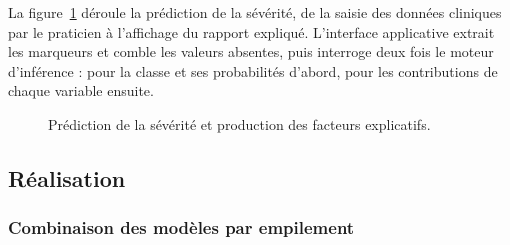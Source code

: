 La figure~\ref{fig:seq-osa} déroule la prédiction de la sévérité, de la saisie des données
cliniques par le praticien à l'affichage du rapport expliqué. L'interface applicative
extrait les marqueurs et comble les valeurs absentes, puis interroge deux fois le moteur
d'inférence : pour la classe et ses probabilités d'abord, pour les contributions de chaque
variable ensuite.

\begin{figure}[H]
\centering
{}
\caption[Séquence de prédiction de la sévérité]%
        {Prédiction de la sévérité et production des facteurs explicatifs.}
\label{fig:seq-osa}
\end{figure}

\subsection{Réalisation}

\subsubsection{Combinaison des modèles par empilement}

